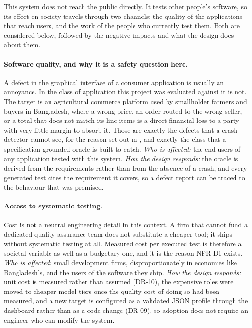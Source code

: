 This system does not reach the public directly. It tests other people's
software, so its effect on society travels through two channels: the quality of
the applications that reach users, and the work of the people who currently
test them. Both are considered below, followed by the negative impacts and what
the design does about them.

\paragraph{Software quality, and why it is a safety question here.} A defect in
the graphical interface of a consumer application is usually an annoyance. In
the class of application this project was evaluated against it is not. The
target is an agricultural commerce platform used by smallholder farmers and
buyers in Bangladesh, where a wrong price, an order routed to the wrong seller,
or a total that does not match its line items is a direct financial loss to a
party with very little margin to absorb it. Those are exactly the defects that
a crash detector cannot see, for the reason set out in
, and exactly the class that a specification-grounded
oracle is built to catch. \emph{Who is affected:} the end users of any
application tested with this system. \emph{How the design responds:} the oracle
is derived from the requirements rather than from the absence of a crash, and
every generated test cites the requirement it covers, so a defect report can be
traced to the behaviour that was promised.

\paragraph{Access to systematic testing.} Cost is not a neutral engineering
detail in this context. A firm that cannot fund a dedicated quality-assurance
team does not substitute a cheaper tool; it ships without systematic testing at
all. Measured cost per executed test is therefore a societal variable as well
as a budgetary one, and it is the reason NFR-D1 exists.
\emph{Who is affected:} small development firms, disproportionately in
economies like Bangladesh's, and the users of the software they ship.
\emph{How the design responds:} unit cost is measured rather than assumed
(DR-10), the expensive roles were moved to cheaper model tiers once the quality
cost of doing so had been measured, and a new target is configured as a
validated JSON profile through the dashboard rather than as a code change
(DR-09), so adoption does not require an engineer who can modify the system.

